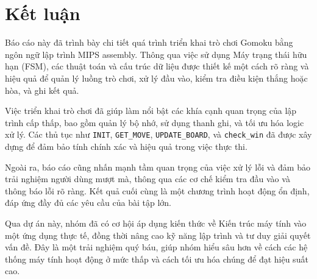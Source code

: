 \section{Kết luận}
Báo cáo này đã trình bày chi tiết quá trình triển khai trò chơi Gomoku bằng ngôn ngữ lập trình MIPS assembly. Thông qua việc sử dụng Máy trạng thái hữu hạn (FSM), các thuật toán và cấu trúc dữ liệu được thiết kế một cách rõ ràng và hiệu quả để quản lý luồng trò chơi, xử lý đầu vào, kiểm tra điều kiện thắng hoặc hòa, và ghi kết quả.

Việc triển khai trò chơi đã giúp làm nổi bật các khía cạnh quan trọng của lập trình cấp thấp, bao gồm quản lý bộ nhớ, sử dụng thanh ghi, và tối ưu hóa logic xử lý. Các thủ tục như \texttt{INIT}, \texttt{GET\_MOVE}, \texttt{UPDATE\_BOARD}, và \texttt{check\_win} đã được xây dựng để đảm bảo tính chính xác và hiệu quả trong việc thực thi.

Ngoài ra, báo cáo cũng nhấn mạnh tầm quan trọng của việc xử lý lỗi và đảm bảo trải nghiệm người dùng mượt mà, thông qua các cơ chế kiểm tra đầu vào và thông báo lỗi rõ ràng. Kết quả cuối cùng là một chương trình hoạt động ổn định, đáp ứng đầy đủ các yêu cầu của bài tập lớn.

Qua dự án này, nhóm đã có cơ hội áp dụng kiến thức về Kiến trúc máy tính vào một ứng dụng thực tế, đồng thời nâng cao kỹ năng lập trình và tư duy giải quyết vấn đề. Đây là một trải nghiệm quý báu, giúp nhóm hiểu sâu hơn về cách các hệ thống máy tính hoạt động ở mức thấp và cách tối ưu hóa chúng để đạt hiệu suất cao.